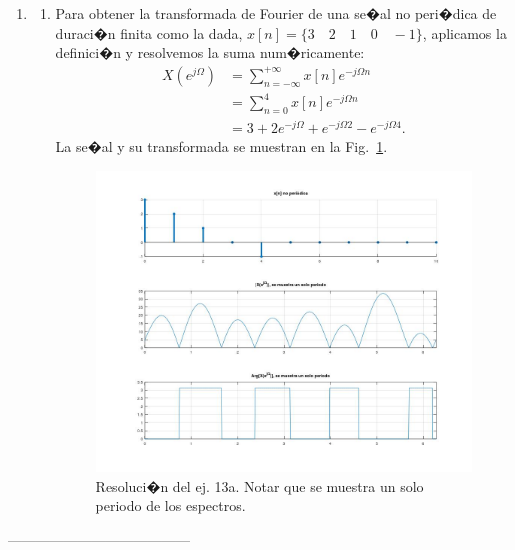 \documentclass[10pt,a4paper]{article}
\begin{document}
\begin{enumerate}
\item
\begin{enumerate}
\item Para obtener la transformada de Fourier de una se�al no peri�dica de duraci�n finita como la dada, 
$x[n]=\{3\quad 2\quad 1\quad 0 \quad -1\}$, aplicamos la definici�n y resolvemos la suma num�ricamente:
\begin{align}
X(e^{j\Omega}) &= \sum_{n=-\infty}^{+\infty}x[n]e^{-j\Omega n}\\
&= \sum_{n=0}^{4}x[n]e^{-j\Omega n}\\
&= \boxed{3+2e^{-j\Omega}+e^{-j\Omega 2}-e^{-j\Omega 4}}.
\end{align}
La se�al y su transformada se muestran en la Fig.~\ref{fig:ej_13a}.
\begin{figure}[h]
	\begin{center}
		\includegraphics[width=16cm]{tp8_ej13a.jpg}
	\end{center}
	\caption{Resoluci�n del ej. 13a. Notar que se muestra un solo periodo de los espectros.}
	\label{fig:ej_13a}
\end{figure}

\end{enumerate}


\end{enumerate}
\begin{center}
---------------------------------------
\end{center}
\end{document}
